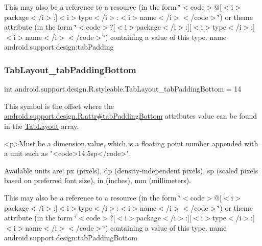 This may also be a reference to a resource (in the form \char`\"{}$<$code$>$@\mbox{[}$<$i$>$package$<$/i$>$\+:\mbox{]}$<$i$>$type$<$/i$>$\+:$<$i$>$name$<$/i$>$$<$/code$>$\char`\"{}) or theme attribute (in the form \char`\"{}$<$code$>$?\mbox{[}$<$i$>$package$<$/i$>$\+:\mbox{]}\mbox{[}$<$i$>$type$<$/i$>$\+:\mbox{]}$<$i$>$name$<$/i$>$$<$/code$>$\char`\"{}) containing a value of this type.  name android.\+support.\+design\+:tab\+Padding \mbox{\label{classandroid_1_1support_1_1design_1_1R_1_1styleable_a88bec9e2eb895346151cb36bc599871c}} 
\subsubsection{\texorpdfstring{Tab\+Layout\+\_\+tab\+Padding\+Bottom}{TabLayout\_tabPaddingBottom}}
{\footnotesize\ttfamily int android.\+support.\+design.\+R.\+styleable.\+Tab\+Layout\+\_\+tab\+Padding\+Bottom = 14\hspace{0.3cm}{\ttfamily [static]}}

This symbol is the offset where the \hyperlink{classandroid_1_1support_1_1design_1_1R_1_1attr_a4daed894a5c7b644541f7c480e446a66}{android.\+support.\+design.\+R.\+attr\#tab\+Padding\+Bottom} attribute\textquotesingle{}s value can be found in the \hyperlink{classandroid_1_1support_1_1design_1_1R_1_1styleable_a514b47b47f600f9421b65f4f0aa832d6}{Tab\+Layout} array.

\begin{DoxyVerb}      <p>Must be a dimension value, which is a floating point number appended with a unit such as "<code>14.5sp</code>".
\end{DoxyVerb}
 Available units are\+: px (pixels), dp (density-\/independent pixels), sp (scaled pixels based on preferred font size), in (inches), mm (millimeters). 

This may also be a reference to a resource (in the form \char`\"{}$<$code$>$@\mbox{[}$<$i$>$package$<$/i$>$\+:\mbox{]}$<$i$>$type$<$/i$>$\+:$<$i$>$name$<$/i$>$$<$/code$>$\char`\"{}) or theme attribute (in the form \char`\"{}$<$code$>$?\mbox{[}$<$i$>$package$<$/i$>$\+:\mbox{]}\mbox{[}$<$i$>$type$<$/i$>$\+:\mbox{]}$<$i$>$name$<$/i$>$$<$/code$>$\char`\"{}) containing a value of this type.  name android.\+support.\+design\+:tab\+Padding\+Bottom \mbox{\label{classandroid_1_1support_1_1design_1_1R_1_1styleable_ab963ac8c82c085a0a654975e88afb71b}} 
